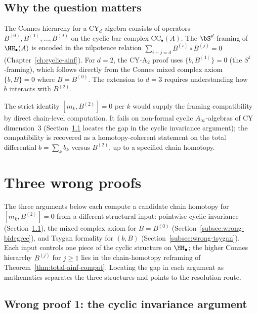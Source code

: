 \subsection{Why the question matters}
\label{subsec:m3b2-why}

The Connes hierarchy for a CY$_d$ algebra consists of operators
$B^{(0)}, B^{(1)}, \ldots, B^{(d)}$ on the cyclic bar complex
$\mathrm{CC}_\bullet(A)$. The $\bS^d$-framing of $\HH_\bullet(A)$
is encoded in the nilpotence relation
$\sum_{i+j=d} B^{(i)} \circ B^{(j)} = 0$
(Chapter~\ref{ch:cyclic-ainf}). For $d = 2$, the CY-A$_2$
proof uses $\{b, B^{(1)}\} = 0$ (the $S^1$-framing), which
follows directly from the Connes mixed complex axiom
$\{b, B\} = 0$ where $B = B^{(0)}$. The extension to $d = 3$
requires understanding how $b$ interacts with $B^{(2)}$.

The strict identity $[m_k, B^{(2)}] = 0$ per $k$ would supply the
framing compatibility by direct chain-level computation. It fails on
non-formal cyclic $A_\infty$-algebras of CY dimension~$3$
(Section~\ref{subsec:wrong-cyclic} locates the gap in the cyclic
invariance argument); the compatibility is recovered as a
homotopy-coherent statement on the total differential
$b = \sum_k b_k$ versus $B^{(2)}$, up to a specified chain homotopy.


\section{Three wrong proofs}
\label{sec:m3b2-wrong-proofs}

The three arguments below each compute a candidate chain homotopy for
$[m_k, B^{(2)}] = 0$ from a different structural input: pointwise
cyclic invariance (Section~\ref{subsec:wrong-cyclic}), the mixed
complex axiom for $B = B^{(0)}$ (Section~\ref{subsec:wrong-bidegree}),
and Tsygan formality for $(b, B)$ (Section~\ref{subsec:wrong-tsygan}).
Each input controls one piece of the cyclic structure on
$\HH_\bullet$; the higher Connes hierarchy $B^{(j)}$ for $j \geq 1$
lies in the chain-homotopy reframing of
Theorem~\ref{thm:total-ainf-compat}. Locating the gap in each
argument as mathematics separates the three structures and points
to the resolution route.


\subsection{Wrong proof 1: the cyclic invariance argument}
\label{subsec:wrong-cyclic}

